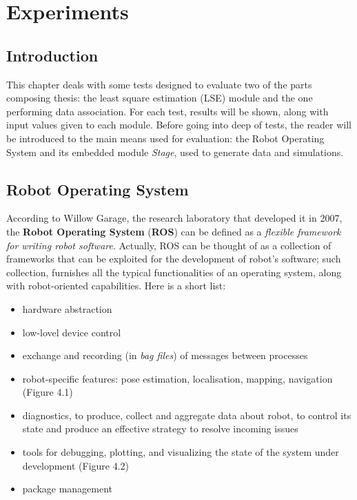 \documentclass[a4paper, onecolumn]{report}
\begin{document}
\chapter{Experiments}
\section{Introduction}
This chapter deals with some tests designed to evaluate two of the parts composing thesis: the least square estimation (LSE) module and the one performing data association. For each test, results will be shown, along with input values given to each module.
Before going into deep of tests, the reader will be introduced to the main means used for evaluation: the Robot Operating System and its embedded module \emph{Stage}, used to generate data and simulations.

 
\section{Robot Operating System}
According to Willow Garage, the research laboratory that developed it in 2007, the \textbf{Robot Operating System} (\textbf{ROS}) can be defined as a \emph{flexible framework for writing robot software}. Actually, ROS can be thought of as a collection of frameworks that can be exploited for the development of robot's software; such collection, furnishes all the typical functionalities of an operating system,  along with robot-oriented capabilities. Here is a short list:
\begin{itemize}
	\item{hardware abstraction}
	\item{low-lovel device control}
	\item{exchange and recording (in \emph{bag files}) of messages between processes}
	\item{robot-specific features: pose estimation, localisation, mapping, navigation (Figure 4.1)}
	\item{diagnostics, to produce, collect and aggregate data about robot, to control its state and produce an effective strategy to resolve incoming issues}
	\item{tools for debugging, plotting, and visualizing the state of the system under development (Figure 4.2)}
	\item{package management}
\end{itemize}
\end{document}
